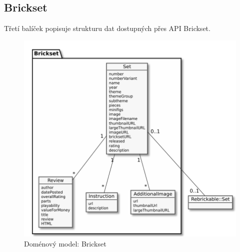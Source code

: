 \subsection{Brickset}
Třetí balíček popisuje strukturu dat dostupných přes \gls{API} Brickset.   

\begin{figure}[htbp]
    \centering
    \includegraphics[width=\textwidth,height=\textheight,keepaspectratio]{pdfs/domain_brickset}
    \caption{Doménový model: Brickset \label{diagram-domenovy-brickset}}
\end{figure}